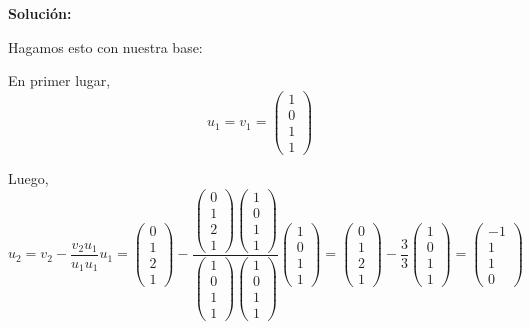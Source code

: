 \documentclass[12pt]{article}
\newenvironment{solucion}
{\begin{mdframed}[backgroundcolor=black!10]
		{\bf Solución:}\\
	}
	{
	\end{mdframed}
}
\newenvironment{preguntas}
{\begin{enumerate}\itemsep12pt
	}
	{
	\end{enumerate}
}
\begin{document}
\begin{preguntas}
\begin{solucion}
\begin{enumerate}[a)]
			Hagamos esto con nuestra base:
			
			En primer lugar,
			$$u_1 = v_1 = \begin{pmatrix}
			1 \\ 0 \\ 1 \\ 1
			\end{pmatrix}$$
			
			Luego,
			$$u_2 = v_2 - \dfrac{v_2u_1}{u_1u_1}u_1
			= \begin{pmatrix}
			0 \\ 1 \\ 2 \\ 1
			\end{pmatrix} - \dfrac{\begin{pmatrix}
				0 \\ 1 \\ 2 \\ 1
				\end{pmatrix}\begin{pmatrix}
				1 \\ 0 \\ 1 \\ 1
				\end{pmatrix}}{\begin{pmatrix}
				1 \\ 0 \\ 1 \\ 1
				\end{pmatrix}\begin{pmatrix}
				1 \\ 0 \\ 1 \\ 1
				\end{pmatrix}}\begin{pmatrix}
			1 \\ 0 \\ 1 \\ 1
			\end{pmatrix} 
			= \begin{pmatrix}
			0 \\ 1 \\ 2 \\ 1
			\end{pmatrix} - \dfrac{3}{3}\begin{pmatrix}
			1 \\ 0 \\ 1 \\ 1
			\end{pmatrix} 
			= \begin{pmatrix}
			-1 \\ 1 \\ 1 \\ 0

\end{pmatrix}$$
\end{enumerate}
\end{solucion}
\end{preguntas}
\end{document}

